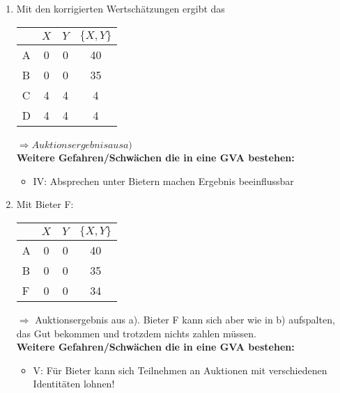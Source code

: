 \documentclass[12pt]{extreport} %
\theoremstyle{named}
\theoremstyle{nnamed}
\theoremstyle{itshape}
\theoremstyle{normal}
\begin{document}
\begin{enumerate}
	\item Mit den korrigierten Wertschätzungen ergibt das
		\begin{figure*}[hbt]	\centering
			\begin{tabular}{l|ccc}
 			 & $X$ & $Y$ & $\{X, Y \}$ \\
  				\hline
  			A & 0 & 0 & 40 \\
  			B & 0 & 0 & 35 \\
  			C & 4 & 4 & 4 \\
  			D & 4 & 4 & 4
		\end{tabular}
		\end{figure*}
		$\Rightarrow Auktionsergebnis aus a)$  ~\\
				\textbf{Weitere Gefahren/Schwächen die in eine GVA bestehen:}
		\begin{itemize}
			\item IV: Absprechen unter Bietern machen Ergebnis beeinflussbar
		\end{itemize}
	\item Mit Bieter F:
	\begin{figure*}[hbt]	\centering
			\begin{tabular}{l|ccc}
 			 & $X$ & $Y$ & $\{X, Y \}$ \\
  				\hline
  			A & 0 & 0 & 40 \\
  			B & 0 & 0 & 35 \\
  			F & 0 & 0 & 34
		\end{tabular}
		\end{figure*}
		$\Rightarrow$ Auktionsergebnis aus a). Bieter F kann sich aber wie in b) aufspalten, das Gut bekommen und trotzdem nichts zahlen müssen. ~\\
						\textbf{Weitere Gefahren/Schwächen die in eine GVA bestehen:}
		\begin{itemize}
			\item V: Für Bieter kann sich Teilnehmen an Auktionen mit verschiedenen Identitäten lohnen!
		\end{itemize}
\end{enumerate}


\printindex
\end{document}
